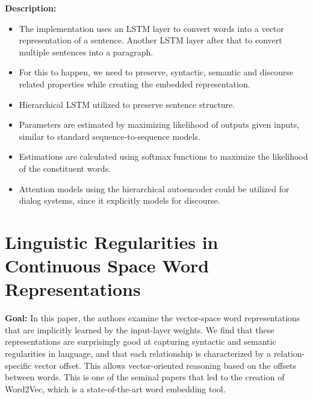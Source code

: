 \documentclass[11pt,a4paper]{article}
\begin{document}
  \textbf{Description:}
  \begin{itemize}
    \item
    The implementation uses an LSTM layer to convert words into a vector representation of a sentence. Another LSTM layer after that to convert multiple sentences into a paragraph.
    \item
    For this to happen, we need to preserve, syntactic, semantic and discourse related properties while creating the embedded representation.
    \item
    Hierarchical LSTM utilized to preserve sentence structure.
    \item
    Parameters are estimated by maximizing likelihood of outputs given inputs, similar to standard sequence-to-sequence models.
    \item
    Estimations are calculated using softmax functions to maximize the likelihood of the constituent words.
    \item
    Attention models using the hierarchical autoencoder could be utilized for dialog systems, since it explicitly models for discourse.
  \end{itemize}



\section{Linguistic Regularities in Continuous Space Word Representations} %
\label{sec:linguistic_regularities_in_continuous_space_word_representations}


  \textbf{Goal:}
  In this paper, the authors examine the vector-space word representations that are implicitly learned by the input-layer weights. We find that these representations are surprisingly good at capturing syntactic and semantic regularities in language, and that each relationship is characterized by a relation-specific vector offset. This allows vector-oriented reasoning based on the offsets between words\cite{mikolov2013linguistic}. This is one of the seminal papers that led to the creation of Word2Vec, which is a state-of-the-art word embedding tool\cite{mikolov2013efficient}.\\
\end{document}
